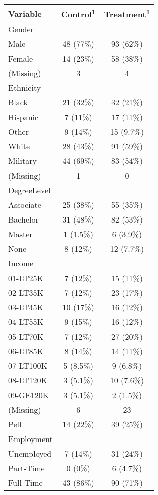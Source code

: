 \begin{appendix}
\captionsetup[table]{labelformat=empty,skip=1pt}
\setlength{\LTpost}{0mm}
\begin{longtable}{lcc}
\toprule
\textbf{Variable} & \textbf{Control}\textsuperscript{1} & \textbf{Treatment}\textsuperscript{1} \\ 
\midrule
Gender &  &  \\ 
Male & 48 (77\%) & 93 (62\%) \\ 
Female & 14 (23\%) & 58 (38\%) \\ 
(Missing) & 3 & 4 \\ 
Ethnicity &  &  \\ 
Black & 21 (32\%) & 32 (21\%) \\ 
Hispanic & 7 (11\%) & 17 (11\%) \\ 
Other & 9 (14\%) & 15 (9.7\%) \\ 
White & 28 (43\%) & 91 (59\%) \\ 
Military & 44 (69\%) & 83 (54\%) \\ 
(Missing) & 1 & 0 \\ 
DegreeLevel &  &  \\ 
Associate & 25 (38\%) & 55 (35\%) \\ 
Bachelor & 31 (48\%) & 82 (53\%) \\ 
Master & 1 (1.5\%) & 6 (3.9\%) \\ 
None & 8 (12\%) & 12 (7.7\%) \\ 
Income &  &  \\ 
01-LT25K & 7 (12\%) & 15 (11\%) \\ 
02-LT35K & 7 (12\%) & 23 (17\%) \\ 
03-LT45K & 10 (17\%) & 16 (12\%) \\ 
04-LT55K & 9 (15\%) & 16 (12\%) \\ 
05-LT70K & 7 (12\%) & 27 (20\%) \\ 
06-LT85K & 8 (14\%) & 14 (11\%) \\ 
07-LT100K & 5 (8.5\%) & 9 (6.8\%) \\ 
08-LT120K & 3 (5.1\%) & 10 (7.6\%) \\ 
09-GE120K & 3 (5.1\%) & 2 (1.5\%) \\ 
(Missing) & 6 & 23 \\ 
Pell & 14 (22\%) & 39 (25\%) \\ 
Employment &  &  \\ 
Unemployed & 7 (14\%) & 31 (24\%) \\ 
Part-Time & 0 (0\%) & 6 (4.7\%) \\ 
Full-Time & 43 (86\%) & 90 (71\%) \\ 

\end{longtable}
\end{appendix}

